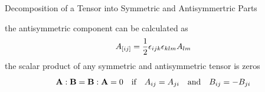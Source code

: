 \documentclass[9pt,mathserif]{beamer}
\begin{document}
\begin{frame}{Decomposition of a Tensor into Symmetric and Antisymmertric Parts}
	\begin{outline}
		\1 the antisymmetric component can be calculated as
		$$A_{[ij]} = \frac12 \epsilon_{ijk}\epsilon_{klm}A_{lm}$$
		\1 the scalar product of any symmetric and antisymmetric tensor is zeros
		$$\vb{A} : \vb{B} = \vb{B} :\vb{A} = 0 \qif A_{ij} = A_{ji} \qand B_{ij}=-B_{ji}$$
	\end{outline}
\end{frame}
\end{document}
